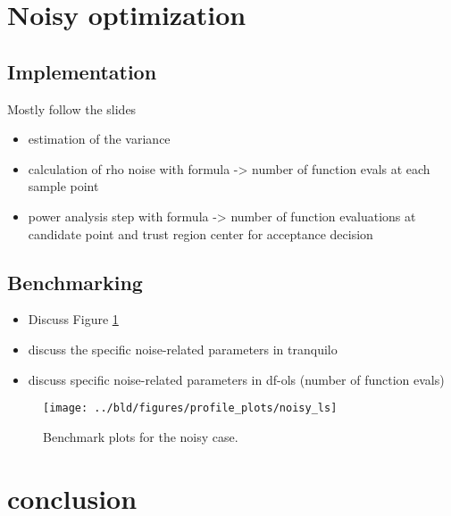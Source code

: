 \section{Noisy optimization}

\subsection{Implementation}
\label{subsec:algo-impl-noisy}
Mostly follow the slides
\begin{itemize}
    \item estimation of the variance
    \item calculation of rho noise with formula -> number of function evals at each sample point
    \item power analysis step with formula -> number of function evaluations at candidate point and trust region center for acceptance decision
\end{itemize}
\subsection{Benchmarking}
\label{subsec:benchmarking-noisy}
\begin{itemize}
    \item Discuss Figure \ref{fig:noisy::benchmark}
    \item discuss the specific noise-related parameters in tranquilo
    \item discuss specific noise-related parameters in df-ols (number of function evals)
\end{itemize}

\begin{figure}
    \texttt{[image: ../bld/figures/profile\_plots/noisy\_ls]}
    \caption{Benchmark plots for the noisy case.}
    \label{fig:noisy::benchmark}
\end{figure}

\section{conclusion}
